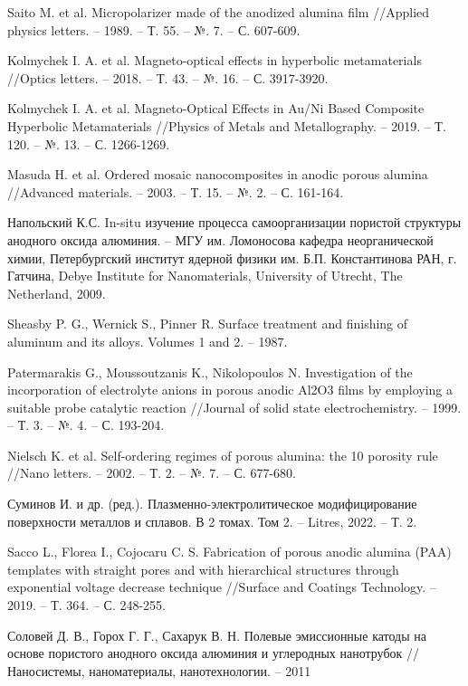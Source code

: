 \begin{thebibliography}{00}
Saito M. et al. Micropolarizer made of the anodized alumina film //Applied physics letters. – 1989. – Т. 55. – №. 7. – С. 607-609.

Kolmychek I. A. et al. Magneto-optical effects in hyperbolic metamaterials //Optics letters. – 2018. – Т. 43. – №. 16. – С. 3917-3920.

Kolmychek I. A. et al. Magneto-Optical Effects in Au/Ni Based Composite Hyperbolic Metamaterials //Physics of Metals and Metallography. – 2019. – Т. 120. – №. 13. – С. 1266-1269.

Masuda H. et al. Ordered mosaic nanocomposites in anodic porous alumina //Advanced materials. – 2003. – Т. 15. – №. 2. – С. 161-164.

Напольский К.С. In-situ изучение процесса самоорганизации пористой структуры анодного оксида алюминия. – МГУ им. Ломоносова кафедра неорганической химии, Петербургский институт ядерной физики им. Б.П. Константинова РАН, г. Гатчина, Debye Institute for Nanomaterials, University of Utrecht, The Netherland, 2009.

Sheasby P. G., Wernick S., Pinner R. Surface treatment and finishing of aluminum and its alloys. Volumes 1 and 2. – 1987.

Patermarakis G., Moussoutzanis K., Nikolopoulos N. Investigation of the incorporation of electrolyte anions in porous anodic Al2O3 films by employing a suitable probe catalytic reaction //Journal of solid state electrochemistry. – 1999. – Т. 3. – №. 4. – С. 193-204.

Nielsch K. et al. Self-ordering regimes of porous alumina: the 10 porosity rule //Nano letters. – 2002. – Т. 2. – №. 7. – С. 677-680.

Суминов И. и др. (ред.). Плазменно-электролитическое модифицирование поверхности металлов и сплавов. В 2 томах. Том 2. – Litres, 2022. – Т. 2.

Sacco L., Florea I., Cojocaru C. S. Fabrication of porous anodic alumina (PAA) templates with straight pores and with hierarchical structures through exponential voltage decrease technique //Surface and Coatings Technology. – 2019. – Т. 364. – С. 248-255.

Соловей Д. В., Горох Г. Г., Сахарук В. Н. Полевые эмиссионные катоды на основе пористого анодного оксида алюминия и углеродных нанотрубок //Наносистемы, наноматериалы, нанотехнологии. – 2011


\end{thebibliography}

